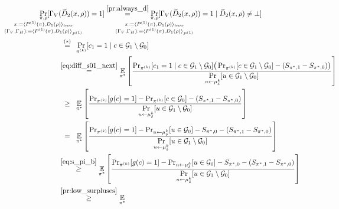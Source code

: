 \begin{align*}
\underset{
  \mathclap{
  \substack{\pi, \rho \\ x := \langle P^{(1)}(\pi), D_1(\rho) \rangle_{\trans}
    \\ (\Gamma_V, \Gamma_H) := \langle P^{(1)}(\pi), D_1 (\rho) \rangle_{P^{(1)}} }}}
{\Pr}[\Gamma_V&(\widetilde{D}_2(x,\rho)) = 1]
  \overset{\eqref{pr:always_d}}{=}
\underset{
  \mathclap{
  \substack{\pi, \rho \\ x := \langle P^{(1)}(\pi), D_1(\rho) \rangle_{\trans}
    \\ (\Gamma_V, \Gamma_H) := \langle P^{(1)}(\pi), D_1 (\rho) \rangle_{P^{(1)}} }}}
{\Pr}[\Gamma_V(\widetilde{D}_2(x,\rho)) = 1 \mid \widetilde{D}_2(x,\rho) \neq \bot] \\
  &\overset{\hphantom{a}(*)\hphantom{a}}{=} \underset{\pi^{(k)}}{\Pr}[c_1 = 1 \mid c \in \cG_1 \setminus \cG_0] \\
  &\overset{\eqref{eq:diff_s01_next}}{=} \underset{\pi^*}{\mathbb{E}}
  \left[\frac{\Pr_{\pi^{(k)}}[c_1 = 1 \mid c \in \cG_1 \setminus \cG_0] \big(\Pr_{\pi^{(k)}}[c \in \cG_1 \setminus \cG_0] - (S_{\pi^*,1} - S_{\pi^*,0})\big)}
  {\underset{u \leftarrow \mu_{\delta}^{k}}{\Pr}[u \in \cG_1 \setminus \cG_0]}\right] \\
  &\overset{\hphantom{a(*)}\hphantom{a}}{\geq} \underset{\pi^*}{\mathbb{E}}
  \left[\frac{\Pr_{\pi^{(k)}}[g(c)=1] - \Pr_{\pi^{(k)}}[c \in \cG_0]  - (S_{\pi^*,1} - S_{\pi^*,0})}
  {\underset{u \leftarrow \mu_{\delta}^{k}}{\Pr}[u \in \cG_1 \setminus \cG_0]}\right] \\
  &\overset{\hphantom{a(*)}\hphantom{a}}{=} \underset{\pi^*}{\mathbb{E}}
  \left[\frac{\Pr_{\pi^{(k)}}[g(c)=1] - \Pr_{u \leftarrow \mu_{\delta}^{k}}[u \in \cG_0] - S_{\pi^*,0}  - (S_{\pi^*,1} - S_{\pi^*,0})}
  {\underset{u \leftarrow \mu_{\delta}^{k}}{\Pr}[u \in \cG_1 \setminus \cG_0]}\right]\\
  &\overset{\eqref{eq:s_pi_b}}{\geq} \underset{\pi^*}{\mathbb{E}}
  \left[\frac{\Pr_{\pi^{(k)}}[g(c)=1] - \Pr_{u \leftarrow \mu_{\delta}^{k}}[u \in \cG_0] - S_{\pi^*,0}  - (S_{\pi^*,1} - S_{\pi^*,0})}
  {\underset{u \leftarrow \mu_{\delta}^{k}}{\Pr}[u \in \cG_1 \setminus \cG_0]}\right]\\
  &\overset{\eqref{pr:low_surpluses}}{\geq} \underset{\pi^*}{\mathbb{E}}

\end{align*}
